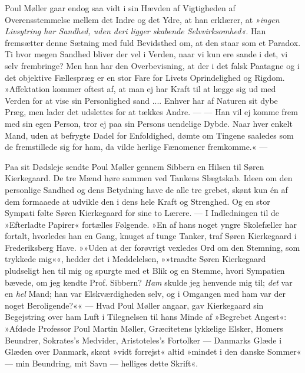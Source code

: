 \documentclass[12pt,a4paper,openany]{book}
\newcommand{\opage}[1]{\marginnote{\footnotesize\textit{[#1]}}}
\begin{document}
Poul Møller gaar endog saa vidt i sin Hævden af
Vigtigheden af Overensstemmelse mellem det Indre og
det Ydre, at han erklærer, at \textit{»ingen Livsytring har
Sandhed, uden deri ligger skabende Selvvirksomhed«}. Han
fremsætter denne Sætning med fuld Bevidsthed om, at
den staar som et Paradox. Ti hvor megen Sandhed
bliver der vel i Verden, naar vi kun ere sande i det, vi
selv frembringe? Men han har den Overbevisning, at der
i det falsk Paatagne og i det objektive Fællespræg er en
stor Fare for Livets Oprindelighed og Rigdom. »Affektation
kommer oftest af, at man ej har Kraft til at lægge
sig ud med Verden for at vise sin Personlighed sand ....
Enhver har af Naturen sit dybe Præg, men lader det
udslettes for at tækkes Andre. --- --- Han vil ej komme
\opage{26}frem med sin egen Person, tror ej paa sin Persons uendelige
Dybde. Naar hver enkelt Mand, uden at befrygte
Dadel for Enfoldighed, dømte om Tingene saaledes som
de fremstillede sig for ham, da vilde herlige Fænomener
fremkomme.« ---

Paa sit Dødsleje sendte Poul Møller gennem Sibbern
en Hilsen til Søren Kierkegaard. De tre Mænd høre
sammen ved Tankens Slægtskab. Ideen om den personlige
Sandhed og dens Betydning have de alle tre grebet,
skønt kun én af dem formaaede at udvikle den i dens
hele Kraft og Strenghed. Og en stor Sympati følte
Søren Kierkegaard for sine to Lærere. --- I Indledningen
til de »Efterladte Papirer« fortælles Følgende. »En af
hans noget yngre Skolefæller har fortalt, hvorledes han
en Gang, knuget af tunge Tanker, traf Søren Kierkegaard
i Frederiksberg Have. »»Uden at der forøvrigt
vexledes Ord om den Stemning, som trykkede mig««,
hedder det i Meddelelsen, »»traadte Søren Kierkegaard
pludseligt hen til mig og spurgte med et Blik og en
Stemme, hvori Sympatien bævede, om jeg kendte Prof.
Sibbern? \textit{Ham} skulde jeg henvende mig til; \textit{det} var en
\textit{hel} Mand; han var Elskværdigheden selv, og i Omgangen
med ham var der noget Beroligende?«« --- Hvad Poul
Møller angaar, gav Kierkegaard sin Begejstring over
ham Luft i Tilegnelsen til hans Minde af »Begrebet
Angest«: »Afdøde Professor Poul Martin Møller, Græcitetens
lykkelige Elsker, Homers Beundrer, Sokrates's
Medvider, Aristoteles's Fortolker --- Danmarks Glæde i
Glæden over Danmark, skønt »vidt forrejst« altid »mindet
i den danske Sommer« --- min Beundring, mit Savn
--- helliges dette Skrift«.
\end{document}
